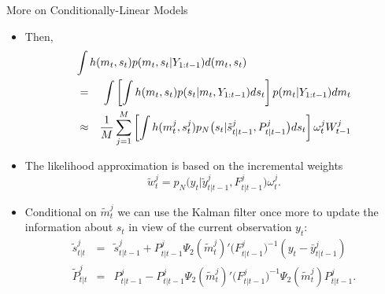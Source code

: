 \documentclass[presentation]{beamer}
\newcommand{\be}{\begin{equation}}
\newcommand{\ee}{\end{equation}}
\begin{document}
\begin{frame}[label={sec:org3bdadb5}]{More on Conditionally-Linear Models}
	\begin{itemize}
		
\item Then,
\begin{eqnarray}
\lefteqn{\int h(m_{t},s_{t}) p(m_t,s_t|Y_{1:t-1}) d(m_t,s_t)} \\
&=& \int \left[ \int h(m_{t},s_{t}) p(s_{t}|m_{t},Y_{1:t-1}) d s_{t} \right] p(m_{t}|Y_{1:t-1}) dm_{t} \label{eq_generalpfhtt1condlinear}  \nonumber \\
&\approx&\frac{1}{M} \sum_{j=1}^M \left[ \int h(m_{t}^j,s_{t}^j) p_N\big(s_t| \tilde{s}_{t|t-1}^j,P_{t|t-1}^j \big) ds_t \right] \omega_t^j W_{t-1}^j \nonumber
\end{eqnarray}
\item The likelihood approximation is based on the incremental weights
\be
\tilde{w}_t^j = p_N \big(y_t|\tilde{y}_{t|t-1}^j,F_{t|t-1}^j \big) \omega_t^j.
\label{eq_generalpfincrweightcondlinear}
\ee
\item Conditional on $\tilde{m}_t^j$ we can use the Kalman filter once more
to update the information about $s_t$ in view of the current observation $y_t$:
\be
\begin{array}{lcl}
	\tilde{s}_{t|t}^j &=& \tilde{s}_{t|t-1}^j + P_{t|t-1}^j \Psi_2(\tilde{m}^j_t)' \big( F_{t|t-1}^j \big)^{-1} (y_t - \bar{y}^j_{t|t-1}) \\
	\tilde{P}_{t|t}^j &=& P^j_{t|t-1} - P^j_{t|t-1} \Psi_2(\tilde{m}^j_t)'\big(F^j_{t|t-1} \big)^{-1} \Psi_2(\tilde{m}^j_t) P_{t|t-1}^j.
\end{array}
\label{eq_pfupdatecondlinear}
\ee
\end{itemize}
\end{frame}
\end{document}
